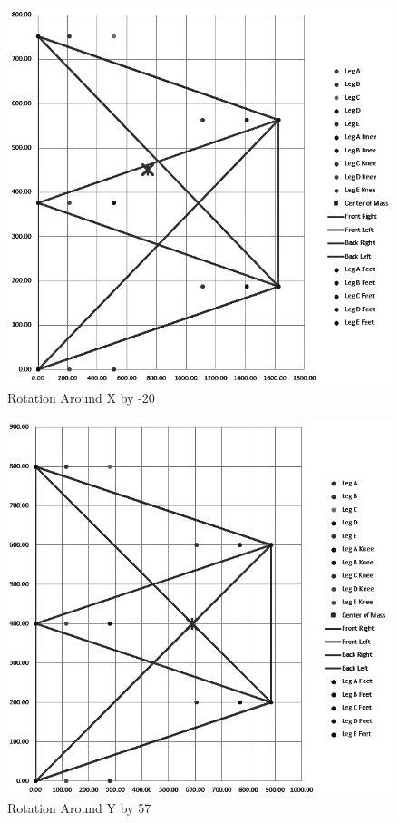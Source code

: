 \begin{figure} [H]
    \centering
    \includegraphics[width=\textwidth]{5_KinematicAndForces/img/CenterMass_-20_X.PNG}
    \caption{Rotation Around X by -20\textdegree{}}
    \label{fig:rotation_-20}
\end{figure}

\begin{figure} [H]
    \centering
    \includegraphics[width=\textwidth]{5_KinematicAndForces/img/CenterMass_57_Y.PNG}
    \caption{Rotation Around Y by 57\textdegree{}}
    \label{fig:rotation_57}
\end{figure}

